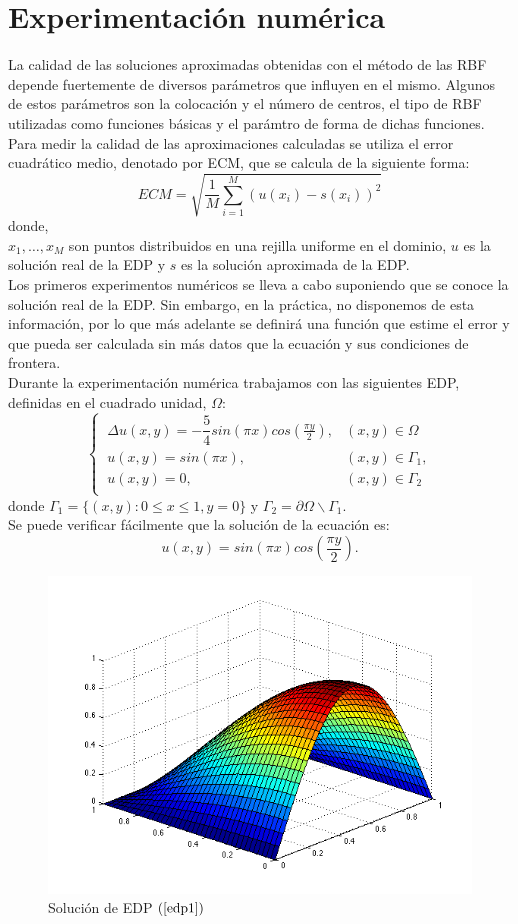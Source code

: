 \documentclass[11pt,a4paper]{article}
\author{Marina Esgueva Ruiz}
\begin{document}
\section{Experimentación numérica}
La calidad de las soluciones aproximadas obtenidas con el método de las RBF depende fuertemente de diversos parámetros que influyen en el mismo. Algunos de estos parámetros son la colocación y el número de centros, el tipo de RBF utilizadas como funciones básicas y el parámtro de forma de dichas funciones. Para medir la calidad de las aproximaciones calculadas se utiliza el error cuadrático medio, denotado por ECM, que se calcula de la siguiente forma: 
$$ECM=\sqrt{\frac{1}{M}\sum_{i=1}^M (u(x_i)-s(x_i))^2}$$
donde, \\
$x_1,\ldots,x_M$ son puntos distribuidos en una rejilla uniforme en el dominio, $u$ es la solución real de la EDP y
$s$ es la solución aproximada de la EDP. \\
Los primeros experimentos numéricos se lleva a cabo suponiendo que se conoce la solución real de la EDP. Sin embargo, en la práctica, no disponemos de esta información, por lo que más adelante se definirá una función que estime el error y que pueda ser calculada sin más datos que la ecuación y sus condiciones de frontera. \\
Durante la experimentación numérica trabajamos con las siguientes EDP, definidas en el cuadrado unidad, $\Omega$: 
\begin{equation}
\left \lbrace \begin{array}{cc}
\ \Delta u(x,y)=-\dfrac{5}{4}sin(\pi x) cos(\frac{\pi y}{2}), & (x,y) \in \Omega \\
\ u(x,y)=sin(\pi x), & (x,y)\in \Gamma_1, \\
\ u(x,y)=0, & (x,y) \in \Gamma_2\\ 
\end{array} \right.
\label{edp1}
\end{equation}
donde $\Gamma_1=\lbrace (x,y):0\leq x \leq 1, y=0 \rbrace$ y $\Gamma_2= \partial \Omega \backslash \Gamma_1$.\\
Se puede verificar fácilmente que la solución de la ecuación es: 
$$u(x,y)=sin(\pi x) cos(\frac{\pi y}{2}).$$
\begin{figure}[H]
\centering
\includegraphics[scale=.5]{u1.png}
\caption{Solución de EDP $(\ref{edp1})$}
\end{figure}
\end{document}
